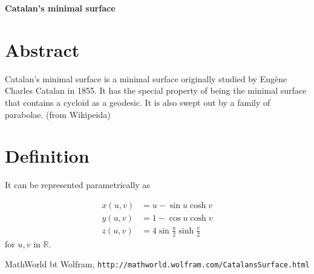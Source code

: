 \documentclass[12pt,dvipdfmx]{article}
\begin{document}
\begin{center}

{\bf \Large Catalan's minimal surface}

\end{center}


\section{Abstract}

Catalan's minimal surface is a minimal surface originally studied by Eugène Charles Catalan in 1855.  
It has the special property of being the minimal surface that contains a cycloid as a geodesic. It is also swept out by a family of parabolae. (from Wikipeida)



\section{Definition}

It can be represented parametrically as

\begin{align*}
x(u,v)&	=	u-\sin u \cosh v	
\\
y(u,v)&	=	1-\cos u \cosh v	
\\
z(u,v)	&=	4 \sin \frac{u}{2} \sinh \frac{v}{2}
\end{align*}
for $u, v$ in $\mathbb{R}$.


\begin{thebibliography}{9}

 MathWorld bt Wolfram, \verb|http://mathworld.wolfram.com/CatalansSurface.html|

\end{thebibliography}
\end{document}
